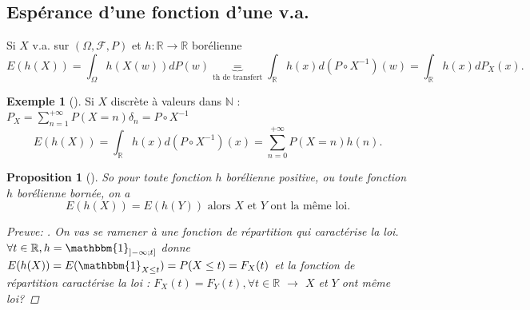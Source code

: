 \documentclass{article}
\theoremstyle{plain}%
\newtheorem{prop}[thm]{Proposition}
\theoremstyle{definition}
\newtheorem{exmp}{Exemple}[section]
\theoremstyle{remark}
\begin{document}
    \subsection{Espérance d'une fonction d'une v.a.}
    Si $ X $ v.a. sur $ (\Omega , \mathcal{F}, P) $ et $ h: \mathbb{R} \to \mathbb{R} $ borélienne 
    \[
        E(h(X)) = \int_{\Omega }^{} h(X(w)) d P(w) \underbrace{=}_{\text{th de transfert}} \int_{\mathbb{R}}^{}h(x) d (P \circ X^{-1}) (w) = \int_{\mathbb{R}}^{} h(x)d P_X(x)
    .\]
    \begin{exmp}[]
        Si $ X $ discrète à valeurs dans $\mathbb{N}$ : $ P_X = \sum_{n=1}^{+ \infty }P(X=n)\delta _n = P \circ X^{-1} $ 
        \[
            E(h(X)) = \int_{\mathbb{R}}^{}h(x)d(P \circ X^{-1})(x) = \sum_{n=0}^{+\infty }P(X=n)h(n)
        .\]
    \end{exmp}
    \begin{prop}[]
        So pour toute fonction $ h $ borélienne positive, ou toute fonction $ h $ borélienne bornée, on a 
        \[
            E(h(X)) = E(h(Y)) \text{ alors } X \text{ et } Y \text{ ont la même loi}
        .\]
        \begin{proof}[Preuve: ]
            On vas se ramener à une fonction de répartition qui caractérise la loi. \\
            $ \forall t \in \mathbb{R}, h=\mathbbm{1}_{]-\infty ; t]} $ donne $ E(h(X)) =E( \mathbbm{1}_{X \leq t})= P(X \leq t) = F_X(t) $ et la fonction de répartition caractérise la loi : $ F_X(t) = F_Y(t), \forall t \in \mathbb{R} $ $\rightarrow$ $ X $ et $ Y $ ont même loi?
        \end{proof}
        
        
    \end{prop}
    
    
    
    
\end{document}

